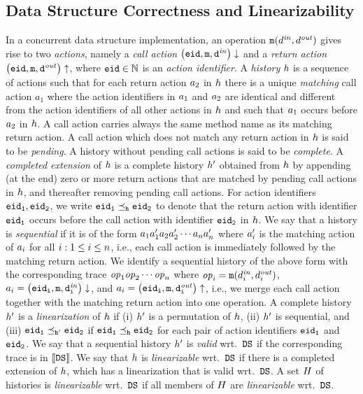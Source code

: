 \subsection{Data Structure Correctness and Linearizability}
In a concurrent
data structure implementation, an operation ${\tt m}(d^{\it in},d^{\it out})$
gives rise to two {\it actions}, namely
a {\it call action} $\left(\tt eid,{\tt m},d^{\it in}\right)\downarrow$ and 
a {\it return action} $\left(\tt eid,{\tt m},d^{\it out}\right)\uparrow$, where $\tt eid\in\mathbb{N}$ is an
{\it action identifier}.
%
A {\it history} $h$ is a sequence of actions such that
for each return action $a_2$ in $h$ there is a unique
{\it matching}  call action $a_1$ where the action identifiers
in $a_1$ and $a_2$ are identical and different from the action
identifiers of all other actions in $h$ and such that
$a_1$ occurs before $a_2$ in $h$.
%
A call action carries always the same method name as its matching return
action.
A call action which does not match any return action in $h$ is said
to be {\em pending}.
A history without pending call actions is said to be {\em complete}.
A {\em completed extension} of $h$ is a complete history
$h'$ obtained from $h$ by
  appending (at the end) zero or more return actions that are matched by
  pending call actions in $h$, and
  thereafter removing pending call actions.
%
For action identifiers $\tt eid_1,\tt eid_2$, we write
$\tt eid_1\preceq_{h}\tt eid_2$ to denote that
the return action with identifier $\tt eid_1$ occurs before
the call action with identifier $\tt eid_2$ in $h$.
We say that a history is {\it sequential} if
it is of the form
$a_1a'_1a_2a'_2\cdots a_na'_n$
where $a'_i$ is the matching action of $a_i$ 
for all $i:1\leq i\leq n$, i.e., each call action 
is immediately followed by the matching return action. 
%
We identify a sequential history of the above form with
the corresponding trace 
${\it op}_1{\it op}_2\cdots{\it op}_n$ where
${\it op}_i={\tt m}(d^{\it in}_i,d^{\it out}_i)$,
$a_i=\left(\tt eid_i,{\tt m},d^{\it in}_{i}\right)\downarrow$, and
$a_i=\left(\tt eid_i,{\tt m},d^{\it out}_{i}\right)\uparrow$,
i.e., we merge each call action together with the matching return action
into one operation.
%
A complete history $h'$ 
is a {\it linearization} of $h$ if
(i) $h'$ is a permutation of $h$,
(ii) $h'$ is sequential, 
and
(iii) $\tt eid_1\preceq_{h'}\tt eid_2$
if $\tt eid_1\preceq_{h}\tt eid_2$
for each pair of action identifiers $\tt eid_1$ and $\tt eid_2$.
%
We say that a sequential history $h'$ is {\it valid} wrt.\ ${\tt DS}$ if
the corresponding trace is in $\left\llbracket{{\tt DS}}\right\rrbracket$.
%
We say that $h$ is {\it linearizable} wrt.\ ${\tt DS}$ if there is
a completed extension of $h$, which has
a linearization that is valid wrt.\ ${\tt DS}$.
%
A set $H$ of histories is {\it linearizable} wrt.\ ${\tt DS}$ if 
all members of $H$ are  {\it linearizable} wrt.\ ${\tt DS}$.

